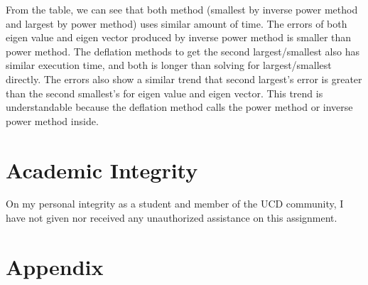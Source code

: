 \documentclass[a4paper,12pt]{article}
\begin{document}
From the table, we can see that both method (smallest by inverse power method and largest by power method)
uses similar amount of time.
The errors of both eigen value and eigen vector produced by inverse power method is smaller than power method.
The deflation methods to get the second largest/smallest also has similar execution time,
and both is longer than solving for largest/smallest directly.
The errors also show a similar trend that second largest's error is greater than the second smallest's for
eigen value and eigen vector.
This trend is understandable because the deflation method calls the power method or inverse power method inside.



\section{Academic Integrity}
On my personal integrity as a student and member of the UCD community, I have not given nor received any unauthorized assistance on this assignment.


\section{Appendix}



\end{document}
